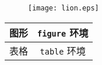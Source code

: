 \begin{figure}[htbp] %
  \centering
  \texttt{[image: lion.eps]}
\end{figure}
\begin{table} %
  \centering
  \begin{tabular}{|c|c|}
    \hline
    图形 & \verb=figure= 环境 \\
    \hline
    表格 & \verb=table= 环境 \\
    \hline
  \end{tabular}
\end{table}
